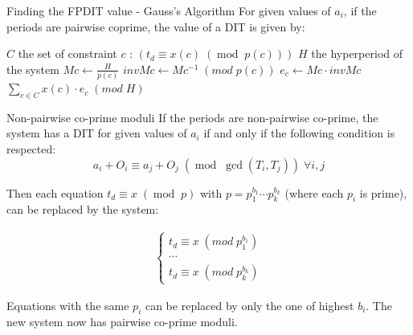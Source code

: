 \documentclass{beamer}
\begin{document}
    \begin{frame}{Finding the FPDIT value - Gauss's Algorithm}
        For given values of $a_i$, if the periods are pairwise coprime, the value of a DIT is given by:

        \begin{algorithm}[H]
            \caption{Gauss's CRP Algorithm}
            \label{alg:algoCRP}
            \begin{algorithmic}[1]
                \REQUIRE $C$ the set of constraint $c$ : $\left( t_d \equiv x(c) \; (\operatorname{mod} \; p(c)) \right)$
                \REQUIRE $H$ the hyperperiod of the system
                    \STATE $Mc \leftarrow \frac{H}{p(c)}$
                    \STATE $invMc \leftarrow Mc^{-1} \; (mod \; p(c))$
                    \STATE $e_c \leftarrow Mc \cdot invMc$
                \ENDFOR
                \RETURN $\sum\limits_{c \in C}{x(c) \cdot e_c} \; (mod \; H)$
            \end{algorithmic}
        \end{algorithm}

    \end{frame}

    \begin{frame}{Non-pairwise co-prime moduli}
        If the periods are non-pairwise co-prime, the system has a DIT for given values of $a_i$ if and only if the following condition is respected:
        \[
            a_i + O_i \equiv a_j + O_j \; (\operatorname{mod} \; \operatorname{gcd}(T_i,
            T_j)) \; \forall i,j
        \]

        Then each equation $t_d \equiv x \; (\operatorname{mod} \; p)$ with $p = p_1^{b_1} \cdots p_k^{b_k}$ (where each $p_i$ is prime), can be replaced by the system:

       \[
            \begin{array}{l}
                \left\{
                    \begin{array}{l}
                         t_d \equiv x \; (mod \; p_1^{b_1}) \\
                         \cdots \\
                         t_d \equiv x \; (mod \; p_k^{b_k})
                    \end{array}
                \right.
            \end{array}
        \]

        Equations with the same $p_i$ can be replaced by only the one of highest $b_i$. The new system now has pairwise co-prime moduli.

    \end{frame}
\end{document}
